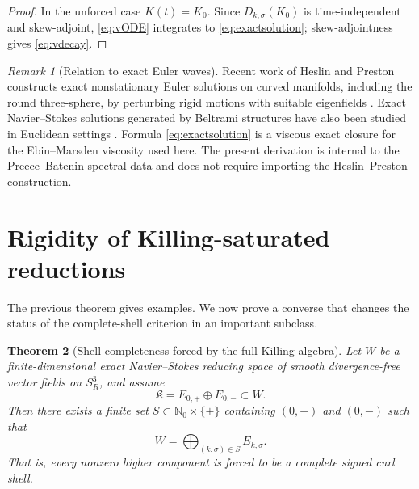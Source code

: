\documentclass[
 aps,
 prd,
 reprint,
 amsmath,
 amssymb,
 nofootinbib,
 superscriptaddress
]{revtex4-2}
\newtheorem{theorem}{Theorem}[section]
\theoremstyle{definition}
\theoremstyle{remark}
\newtheorem{remark}[theorem]{Remark}
\newcommand{\Sthree}{S^3_R}
\newcommand{\cK}{\mathfrak K}
\begin{document}
\begin{proof}
In the unforced case $K(t)=K_0$.  Since $D_{k,\sigma}(K_0)$ is
time-independent and skew-adjoint, \eqref{eq:vODE} integrates to
\eqref{eq:exactsolution}; skew-adjointness gives \eqref{eq:vdecay}.
\end{proof}

\begin{remark}[Relation to exact Euler waves]
Recent work of Heslin and Preston constructs exact nonstationary Euler
solutions on curved manifolds, including the round three-sphere, by perturbing
rigid motions with suitable eigenfields \cite{HeslinPreston2026}. Exact
Navier--Stokes solutions generated by Beltrami structures have also been
studied in Euclidean settings \cite{Baron2025}.  Formula \eqref{eq:exactsolution}
is a viscous exact closure for the Ebin--Marsden viscosity used here.  The
present derivation is internal to the Preece--Batenin spectral data and does
not require importing the Heslin--Preston construction.
\end{remark}



\section{Rigidity of Killing-saturated reductions}

The previous theorem gives examples.  We now prove a converse that changes the
status of the complete-shell criterion in an important subclass.

\begin{theorem}[Shell completeness forced by the full Killing algebra]
\label{thm:Ksaturated}
Let $W$ be a finite-dimensional exact Navier--Stokes reducing space of smooth
divergence-free vector fields on $\Sthree$, and assume
\begin{equation}
 \cK=E_{0,+}\oplus E_{0,-}\subset W.
 \label{eq:containsK}
\end{equation}
Then there exists a finite set
$S\subset\mathbb N_0\times\{\pm\}$ containing $(0,+)$ and $(0,-)$ such that
\begin{equation}
 \boxed{
 W=\bigoplus_{(k,\sigma)\in S}E_{k,\sigma}.
 }
 \label{eq:Wshellunion}
\end{equation}
That is, every nonzero higher component is forced to be a \emph{complete
signed curl shell}.
\end{theorem}
\end{document}
